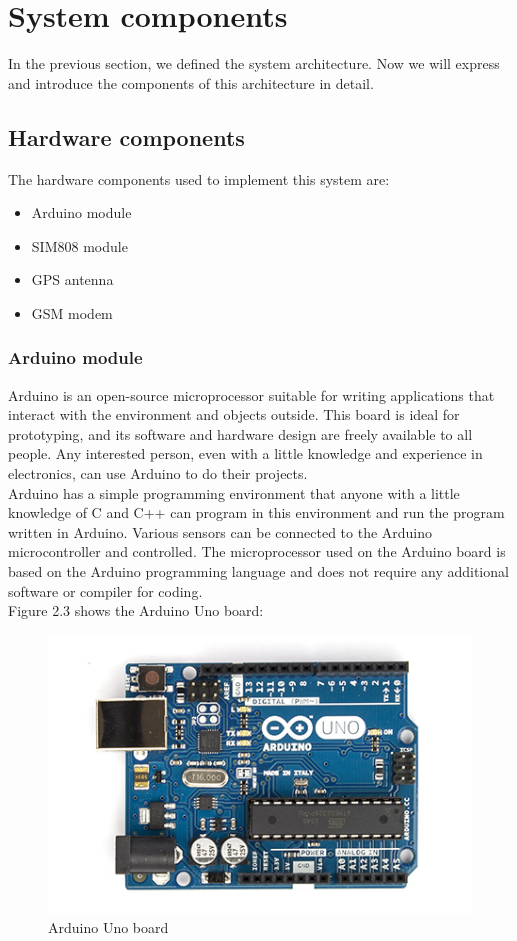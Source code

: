 \section{System components}
In the previous section, we defined the system architecture. Now we will express and introduce the components of this architecture in detail.
\subsection{Hardware components}
The hardware components used to implement this system are:
\begin{itemize}
	\item Arduino module
	\item SIM808 module
	\item GPS antenna
	\item GSM modem
\end{itemize}
\subsubsection{Arduino module}
Arduino is an open-source microprocessor suitable for writing applications that interact with the environment and objects outside. This board is ideal for prototyping, and its software and hardware design are freely available to all people. Any interested person, even with a little knowledge and experience in electronics, can use Arduino to do their projects.\\
Arduino has a simple programming environment that anyone with a little knowledge of C and C++ can program in this environment and run the program written in Arduino. Various sensors can be connected to the Arduino microcontroller and controlled. The microprocessor used on the Arduino board is based on the Arduino programming language and does not require any additional software or compiler for coding.\\
Figure 2.3 shows the Arduino Uno board:
\begin{figure}[!h]
	\centerline{\includegraphics[width=.5\textwidth]{ArduinoUno_R3}}
	\caption{Arduino Uno board}
\end{figure}
